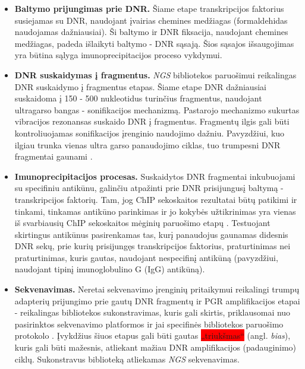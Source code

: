 \documentclass[12pt]{article}
\begin{document}
\begin{itemize}
    \item \textbf{Baltymo prijungimas prie DNR.} Šiame etape transkripcijos faktorius susiejamas su DNR, naudojant įvairias chemines medžiagas (formaldehidas naudojamas dažniausiai). Ši baltymo ir DNR fiksacija,
        naudojant chemines medžiagas, padeda išlaikyti baltymo - DNR
        sąsają. Šios sąsajos išsaugojimas yra būtina sąlyga imunoprecipitacijos
        proceso vykdymui.
    \item \textbf{DNR suskaidymas į fragmentus.} \emph{NGS} bibliotekos 
        paruošimui reikalingas DNR suskaidymo į fragmentus etapas. Šiame etape
        DNR dažniausiai suskaidoma į 150 - 500 nukleotidus turinčius fragmentus,
        naudojant ultragarso bangas - sonifikacijos mechanizmą. Pastarojo
        mechanizmo sukurtas vibracijos rezonansas suskaido DNR į fragmentus.
        Fragmentų ilgis gali būti kontroliuojamas sonifikacijos įrenginio
        naudojimo dažniu. Pavyzdžiui, kuo ilgiau trunka vienas ultra garso
        panaudojimo ciklas, tuo trumpesni DNR fragmentai
        gaunami \cite{SONICATION}.
    \item \textbf{Imunoprecipitacijos procesas.} Suskaidytos DNR fragmentai
        inkubuojami su specifiniu antikūnu, galinčiu atpažinti prie DNR
        prisijungusį baltymą - transkripcijos faktorių. Tam, jog ChIP
        sekoskaitos rezultatai būtų patikimi ir tinkami, tinkamas antikūno
        parinkimas ir jo kokybės užtikrinimas yra vienas iš svarbiausių ChIP
        sekoskaitos mėginių paruošimo etapų \cite{ARTICLE3}. Testuojant
        skirtingus antikūnus pasirenkamas tas, kurį panaudojus gaunamas
        didesnis DNR sekų, prie kurių prisijungęs transkripcijos faktorius,
        praturtinimas nei praturtinimas, kuris gautas, naudojant nespecifinį
        antikūną \cite{ARTICLE4} (pavyzdžiui, naudojant tipinį imunoglobulino G
        (IgG) antikūną).
    \item \textbf{Sekvenavimas.} Neretai sekvenavimo įrenginių pritaikymui
        reikalingi trumpų adapterių prijungimo prie gautų DNR fragmentų ir PGR
        amplifikacijos etapai - reikalingas bibliotekos sukonstravimas, kuris
        gali skirtis, priklausomai nuo pasirinktos sekvenavimo platformos
        ir jai specifinės bibliotekos paruošimo protokolo \cite{ARTICLE5}.
        Įvykdžius šiuos etapus gali būti gautas \colorbox{red}{„triukšmas“} \cite{ARTICLE4}
        (angl. \emph{bias}), kuris gali būti mažesnis, atliekant mažiau DNR
        amplifikacijos (padauginimo) ciklų. Sukonstravus biblioteką atliekamas
        \emph{NGS} sekvenavimas.
\end{itemize}
\end{document}

